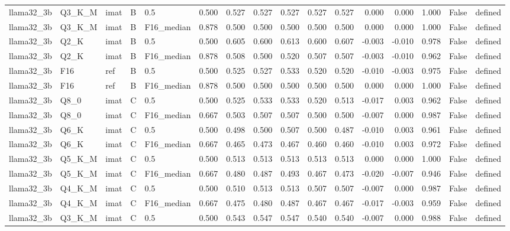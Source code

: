 \begin{tabular}{lllllrrrrrrrrrll}
llama32\_3b & Q3\_K\_M & imat & B & 0.5 & 0.500 & 0.527 & 0.527 & 0.527 & 0.527 & 0.527 & 0.000 & 0.000 & 1.000 & False & defined \\
llama32\_3b & Q3\_K\_M & imat & B & F16\_median & 0.878 & 0.500 & 0.500 & 0.500 & 0.500 & 0.500 & 0.000 & 0.000 & 1.000 & False & defined \\
llama32\_3b & Q2\_K & imat & B & 0.5 & 0.500 & 0.605 & 0.600 & 0.613 & 0.600 & 0.607 & -0.003 & -0.010 & 0.978 & False & defined \\
llama32\_3b & Q2\_K & imat & B & F16\_median & 0.878 & 0.508 & 0.500 & 0.520 & 0.507 & 0.507 & -0.003 & -0.010 & 0.962 & False & defined \\
llama32\_3b & F16 & ref & B & 0.5 & 0.500 & 0.525 & 0.527 & 0.533 & 0.520 & 0.520 & -0.010 & -0.003 & 0.975 & False & defined \\
llama32\_3b & F16 & ref & B & F16\_median & 0.878 & 0.500 & 0.500 & 0.500 & 0.500 & 0.500 & 0.000 & 0.000 & 1.000 & False & defined \\
llama32\_3b & Q8\_0 & imat & C & 0.5 & 0.500 & 0.525 & 0.533 & 0.533 & 0.520 & 0.513 & -0.017 & 0.003 & 0.962 & False & defined \\
llama32\_3b & Q8\_0 & imat & C & F16\_median & 0.667 & 0.503 & 0.507 & 0.507 & 0.500 & 0.500 & -0.007 & 0.000 & 0.987 & False & defined \\
llama32\_3b & Q6\_K & imat & C & 0.5 & 0.500 & 0.498 & 0.500 & 0.507 & 0.500 & 0.487 & -0.010 & 0.003 & 0.961 & False & defined \\
llama32\_3b & Q6\_K & imat & C & F16\_median & 0.667 & 0.465 & 0.473 & 0.467 & 0.460 & 0.460 & -0.010 & 0.003 & 0.972 & False & defined \\
llama32\_3b & Q5\_K\_M & imat & C & 0.5 & 0.500 & 0.513 & 0.513 & 0.513 & 0.513 & 0.513 & 0.000 & 0.000 & 1.000 & False & defined \\
llama32\_3b & Q5\_K\_M & imat & C & F16\_median & 0.667 & 0.480 & 0.487 & 0.493 & 0.467 & 0.473 & -0.020 & -0.007 & 0.946 & False & defined \\
llama32\_3b & Q4\_K\_M & imat & C & 0.5 & 0.500 & 0.510 & 0.513 & 0.513 & 0.507 & 0.507 & -0.007 & 0.000 & 0.987 & False & defined \\
llama32\_3b & Q4\_K\_M & imat & C & F16\_median & 0.667 & 0.475 & 0.480 & 0.487 & 0.467 & 0.467 & -0.017 & -0.003 & 0.959 & False & defined \\
llama32\_3b & Q3\_K\_M & imat & C & 0.5 & 0.500 & 0.543 & 0.547 & 0.547 & 0.540 & 0.540 & -0.007 & 0.000 & 0.988 & False & defined \\

\end{tabular}
